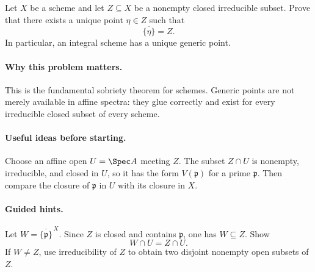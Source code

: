 \begin{problem}
Let $X$ be a scheme and let $Z\subseteq X$ be a nonempty closed irreducible subset.
Prove that there exists a unique point $\eta\in Z$ such that
\[
\overline{\{\eta\}}=Z.
\]
In particular, an integral scheme has a unique generic point.
\end{problem}

\paragraph{Why this problem matters.}
This is the fundamental sobriety theorem for schemes.  Generic points are not merely
available in affine spectra: they glue correctly and exist for every irreducible closed
subset of every scheme.

\paragraph{Useful ideas before starting.}
Choose an affine open $U=\Spec A$ meeting $Z$.  The subset $Z\cap U$ is nonempty,
irreducible, and closed in $U$, so it has the form $V(\mathfrak p)$ for a prime
$\mathfrak p$.  Then compare the closure of $\mathfrak p$ in $U$ with its closure in $X$.

\paragraph{Guided hints.}
Let $W=\overline{\{\mathfrak p\}}^{\,X}$.  Since $Z$ is closed and contains
$\mathfrak p$, one has $W\subseteq Z$.  Show
\[
W\cap U=Z\cap U.
\]
If $W\neq Z$, use irreducibility of $Z$ to obtain two disjoint nonempty open subsets of
$Z$.

